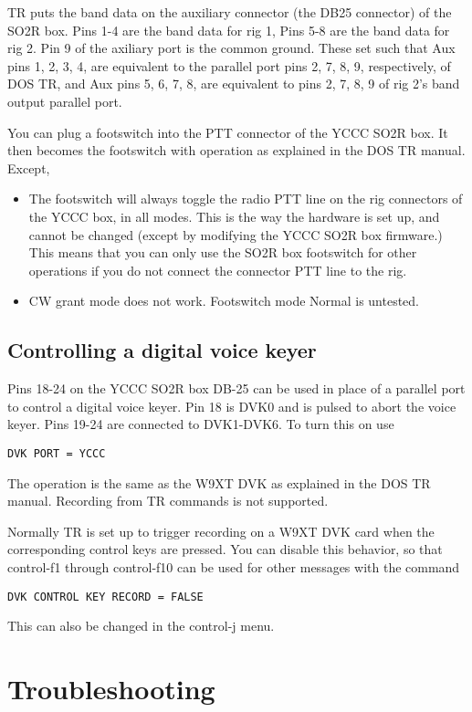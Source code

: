 \documentclass[12pt]{article}
\begin{document}
TR puts the band data
on the auxiliary connector (the DB25 connector)
of the SO2R box. Pins 1-4 are the band data for rig 1, Pins 5-8 are
the band data for rig 2. Pin 9 of the axiliary port is the common ground.
These set such that Aux pins 1, 2, 3, 4,
are equivalent to the parallel port pins 2, 7, 8, 9, respectively, of DOS TR,
and Aux pins 5, 6, 7, 8, are equivalent to pins 2, 7, 8, 9 of rig 2's
band output parallel port.

You can plug a footswitch
into the PTT connector of the YCCC SO2R box.
It then becomes the footswitch with operation as explained in the DOS TR
manual. Except,
\begin{itemize}
\item
The footswitch will always toggle the radio PTT line
on the rig connectors of the YCCC box, in all modes. This is the way the
hardware is set up, and cannot be changed (except by modifying the
YCCC SO2R box firmware.) This means that you can only use the
SO2R box footswitch for other operations if you do not connect the
connector PTT line to the rig.
\item
CW grant mode does not work. Footswitch mode Normal is untested.
\end{itemize}

\subsection{Controlling a digital voice keyer}
Pins 18-24 on the YCCC SO2R box DB-25 can be used in place of a
parallel port to control a digital voice keyer. Pin 18 is DVK0 and is
pulsed to abort the voice keyer. Pins 19-24 are connected to DVK1-DVK6.
To turn this on use
\begin{verbatim}
DVK PORT = YCCC
\end{verbatim}
The operation is the same as the W9XT DVK as explained in the DOS TR
manual. Recording from TR commands is not supported.

Normally TR is set up to trigger recording on a W9XT DVK card when the
corresponding control keys are pressed. You can disable this behavior,
so that control-f1 through control-f10 can be used for other messages
with the command
\begin{verbatim}
DVK CONTROL KEY RECORD = FALSE
\end{verbatim}
This can also be changed in the control-j menu.

\section{Troubleshooting}
\end{document}

